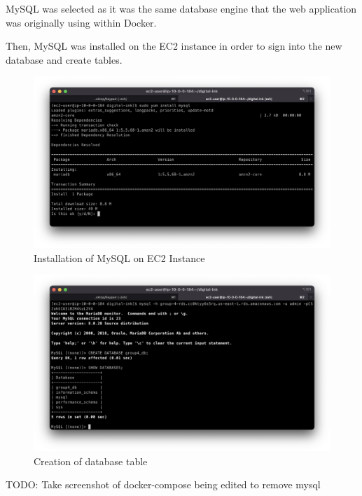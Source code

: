 MySQL was selected as it was the same database engine that the web application was originally using within Docker.

Then, MySQL was installed on the EC2 instance in order to sign into the new database and create tables.

\begin{figure}[!htbp]
\centering
\includegraphics[width=\textwidth]{resources/rds/rds-mysql-install.png}
\caption{Installation of MySQL on EC2 Instance}
\label{fig:rds-msql-install}
\end{figure}

\begin{figure}[!htbp]
\centering
\includegraphics[width=\textwidth]{resources/rds/rds-database-creation.png}
\caption{Creation of database table}
\label{fig:rds-db-create-2}
\end{figure}


TODO: Take screenshot of docker-compose being edited to remove mysql
